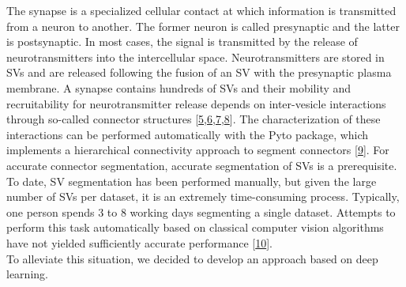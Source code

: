 The synapse is a specialized cellular contact at which information is transmitted from a neuron to another.
The former neuron is called presynaptic and the latter is postsynaptic.
In most cases, the signal is transmitted by the release of neurotransmitters into the intercellular space.
Neurotransmitters are stored in SVs and are released following the fusion of an SV with the presynaptic plasma membrane.
A synapse contains hundreds of SVs and their mobility and recruitability for neurotransmitter release depends on inter-vesicle interactions through so-called connector structures {[}\protect\hyperlink{ref-XQJ3R1HJ}{5},\protect\hyperlink{ref-kjMcXSJ3}{6},\protect\hyperlink{ref-K10hpz3n}{7},\protect\hyperlink{ref-Lw7FpxSz}{8}{]}.
The characterization of these interactions can be performed automatically with the Pyto package, which implements a hierarchical connectivity approach to segment connectors {[}\protect\hyperlink{ref-1HtRUUZQi}{9}{]}.
For accurate connector segmentation, accurate segmentation of SVs is a prerequisite.
To date, SV segmentation has been performed manually, but given the large number of SVs per dataset, it is an extremely time-consuming process.
Typically, one person spends 3 to 8 working days segmenting a single dataset.
Attempts to perform this task automatically based on classical computer vision algorithms have not yielded sufficiently accurate performance {[}\protect\hyperlink{ref-JWuvfT0Z}{10}{]}.\\
To alleviate this situation, we decided to develop an approach based on deep learning.

